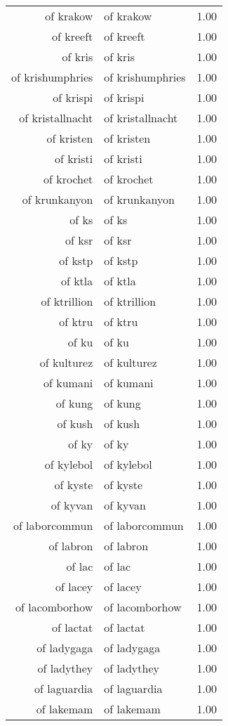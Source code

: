 \begin{table}[ht]
\begin{tabular}{rlr}
  of krakow & of krakow & 1.00 \\ 
  of kreeft & of kreeft & 1.00 \\ 
  of kris & of kris & 1.00 \\ 
  of krishumphries & of krishumphries & 1.00 \\ 
  of krispi & of krispi & 1.00 \\ 
  of kristallnacht & of kristallnacht & 1.00 \\ 
  of kristen & of kristen & 1.00 \\ 
  of kristi & of kristi & 1.00 \\ 
  of krochet & of krochet & 1.00 \\ 
  of krunkanyon & of krunkanyon & 1.00 \\ 
  of ks & of ks & 1.00 \\ 
  of ksr & of ksr & 1.00 \\ 
  of kstp & of kstp & 1.00 \\ 
  of ktla & of ktla & 1.00 \\ 
  of ktrillion & of ktrillion & 1.00 \\ 
  of ktru & of ktru & 1.00 \\ 
  of ku & of ku & 1.00 \\ 
  of kulturez & of kulturez & 1.00 \\ 
  of kumani & of kumani & 1.00 \\ 
  of kung & of kung & 1.00 \\ 
  of kush & of kush & 1.00 \\ 
  of ky & of ky & 1.00 \\ 
  of kylebol & of kylebol & 1.00 \\ 
  of kyste & of kyste & 1.00 \\ 
  of kyvan & of kyvan & 1.00 \\ 
  of laborcommun & of laborcommun & 1.00 \\ 
  of labron & of labron & 1.00 \\ 
  of lac & of lac & 1.00 \\ 
  of lacey & of lacey & 1.00 \\ 
  of lacomborhow & of lacomborhow & 1.00 \\ 
  of lactat & of lactat & 1.00 \\ 
  of ladygaga & of ladygaga & 1.00 \\ 
  of ladythey & of ladythey & 1.00 \\ 
  of laguardia & of laguardia & 1.00 \\ 
  of lakemam & of lakemam & 1.00 \\ 

\end{tabular}
\end{table}

